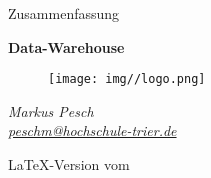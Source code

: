 \begin{titlepage}
  \begin{center}
    \begin{large}
      Zusammenfassung
    \end{large}

    \begin{huge}
      \begin{singlespace}
        \textbf{Data-Warehouse}
      \end{singlespace}
    \end{huge}

    \vspace{0.5cm}

    \begin{figure}[h]
      \centering
      \texttt{[image: img//logo.png]}
      \label{img:fh-trier-logo}
    \end{figure}

    \vspace{2cm}
    \begin{large}
      \textit{Markus Pesch} \\
      \href{mailto:peschm@hochschule-trier.de}{\textit{peschm@hochschule-trier.de}}
    \end{large}
    \vspace{2cm}

    \LaTeX{}-Version  vom 

  \end{center}
\end{titlepage}
